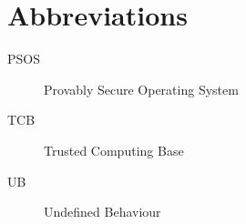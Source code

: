 \chapter*{Abbreviations}\label{abbr}
\begin{description}
    \item[PSOS] Provably Secure Operating System
    \item[TCB] Trusted Computing Base
    \item[UB] Undefined Behaviour
\end{description}
